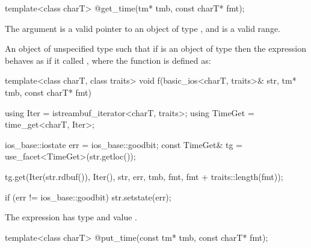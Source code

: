 %
\begin{itemdecl}
template<class charT> @\unspec@ get_time(tm* tmb, const charT* fmt);
\end{itemdecl}

\begin{itemdescr}
\pnum
\expects
The argument  is a valid pointer to an object of type ,
and  is a valid range.

\pnum
\returns
An object of unspecified type such that if  is an object of type
 then the expression  behaves as if it called , where the function  is
defined as:
\begin{codeblock}
template<class charT, class traits>
void f(basic_ios<charT, traits>& str, tm* tmb, const charT* fmt) {
  using Iter    = istreambuf_iterator<charT, traits>;
  using TimeGet = time_get<charT, Iter>;

  ios_base::iostate err = ios_base::goodbit;
  const TimeGet& tg = use_facet<TimeGet>(str.getloc());

  tg.get(Iter(str.rdbuf()), Iter(), str, err, tmb,
    fmt, fmt + traits::length(fmt));

  if (err != ios_base::goodbit)
    str.setstate(err);
}
\end{codeblock}

The expression  has type
 and value .
\end{itemdescr}

%
\begin{itemdecl}
template<class charT> @\unspec@ put_time(const tm* tmb, const charT* fmt);
\end{itemdecl}

